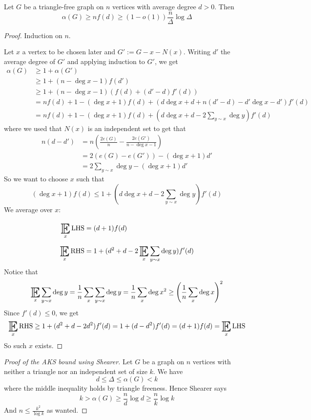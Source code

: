 \documentclass{article}
\begin{document}
\begin{thm}[Shearer]
  Let $G$ be a triangle-free graph on $n$ vertices with average degree $d > 0$.
  Then
  $$\alpha(G) \ge nf(d) \ge (1 - o(1)) \frac n\Delta \log\Delta$$
\end{thm}
\begin{proof}
  Induction on $n$.

  Let $x$ a vertex to be chosen later and $G' := G - x - N(x)$. Writing $d'$ the average degree of $G'$ and applying induction to $G'$, we get
  \begin{align*}
    \alpha(G)
    & \ge 1 + \alpha(G') \\
    & \ge 1 + (n - \deg x - 1)f(d') \\
    & \ge 1 + (n - \deg x - 1)(f(d) + (d' - d)f'(d)) \\
    & = nf(d) + 1 - (\deg x + 1)f(d) + (d\deg x + d + n(d' - d) - d'\deg x - d')f'(d) \\
    & = nf(d) + 1 - (\deg x + 1)f(d) + \left(d\deg x + d - 2\sum_{y \sim x} \deg y\right)f'(d)
  \end{align*}
  where we used that $N(x)$ is an independent set to get that
  \begin{align*}
    n(d - d')
    & = n \left(\frac{2e(G)}n - \frac{2e(G')}{n - \deg x - 1}\right) \\
    & = 2(e(G) - e(G')) - (\deg x + 1)d' \\
    & = 2\sum_{y \sim x} \deg y - (\deg x + 1)d'
  \end{align*}
  So we want to choose $x$ such that
  $$(\deg x + 1)f(d) \le 1 + (d\deg x + d - 2\sum_{y \sim x} \deg y)f'(d)$$
  We average over $x$:
  \begin{align*}
    \E_x \lhs & = (d + 1)f(d) \\
    \E_x \rhs & = 1 + (d^2 + d - 2\E_x\sum_{y \sim x} \deg y)f'(d)
  \end{align*}
  Notice that
  $$\E_x\sum_{y \sim x} \deg y = \frac 1n \sum_x\sum_{y \sim x} \deg y = \frac 1n \sum_x \deg x^2 \ge \left(\frac 1n\sum_x \deg x\right)^2$$
  Since $f'(d) \le 0$, we get
  $$\E_x \rhs \ge 1 + (d^2 + d - 2d^2)f'(d) = 1 + (d - d^2)f'(d) = (d + 1)f(d) = \E_x \lhs$$
  So such $x$ exists.
\end{proof}

\begin{proof}[Proof of the AKS bound using Shearer]
  Let $G$ be a graph on $n$ vertices with neither a triangle nor an independent set of size $k$. We have
  $$d \le \Delta \le \alpha(G) < k$$
  where the middle inequality holds by triangle freeness. Hence Shearer says
  $$k > \alpha(G) \ge \frac nd \log d \ge \frac nk \log k$$
  And $n \le \frac{k^2}{\log k}$ as wanted.
\end{proof}
\end{document}
